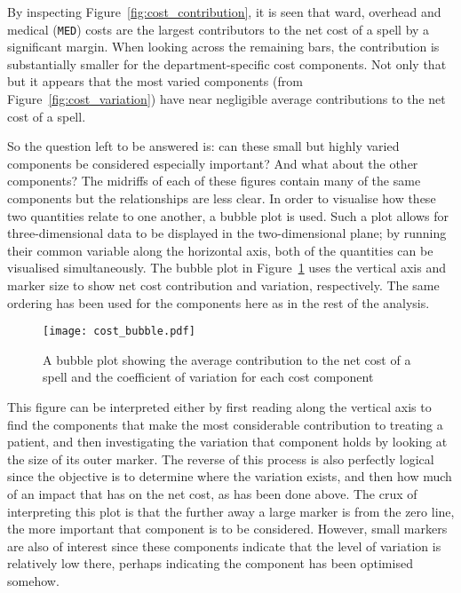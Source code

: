By inspecting Figure~\ref{fig:cost_contribution}, it is seen that ward, overhead
and medical ({\tt MED}) costs are the largest contributors to the net cost of a
spell by a significant margin. When looking across the remaining bars, the
contribution is substantially smaller for the department-specific cost
components. Not only that but it appears that the most varied components (from
Figure~\ref{fig:cost_variation}) have near negligible average contributions to
the net cost of a spell.

So the question left to be answered is: can these small but highly varied
components be considered especially important? And what about the other
components? The midriffs of each of these figures contain many of the same
components but the relationships are less clear. In order to visualise how these
two quantities relate to one another, a bubble plot is used. Such a plot allows
for three-dimensional data to be displayed in the two-dimensional plane; by
running their common variable along the horizontal axis, both of the quantities
can be visualised simultaneously. The bubble plot in
Figure~\ref{fig:cost_bubble} uses the vertical axis and marker size to show net
cost contribution and variation, respectively. The same ordering has been used
for the components here as in the rest of the analysis.

\begin{figure}
    \centering
    \texttt{[image: cost\_bubble.pdf]}
    \caption{%
        A bubble plot showing the average contribution to the net cost of a
        spell and the coefficient of variation for each cost component
    }\label{fig:cost_bubble}
\end{figure}

This figure can be interpreted either by first reading along the vertical axis
to find the components that make the most considerable contribution to treating
a patient, and then investigating the variation that component holds by looking
at the size of its outer marker. The reverse of this process is also perfectly
logical since the objective is to determine where the variation exists, and then
how much of an impact that has on the net cost, as has been done above. The crux
of interpreting this plot is that the further away a large marker is from the
zero line, the more important that component is to be considered. However, small
markers are also of interest since these components indicate that the level of
variation is relatively low there, perhaps indicating the component has been
optimised somehow.

